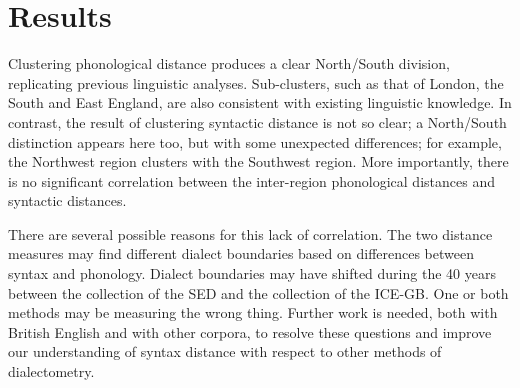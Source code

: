 \documentclass[11pt,letterpaper]{article}
\begin{document}
\section{Results}
Clustering phonological distance produces a clear North/South division, replicating
previous linguistic analyses. Sub-clusters, such as that of London, the
South and East England, are also consistent with existing linguistic
knowledge. In contrast, the result of clustering syntactic distance is not so clear; a
North/South distinction appears here too, but with some unexpected
differences; for example, the
Northwest region clusters with the Southwest region. More importantly,
there is no significant correlation between the inter-region
phonological distances and syntactic distances.

There are several possible reasons for this lack of correlation. The
two distance measures may find different dialect boundaries based on
differences between syntax and phonology. Dialect boundaries may have
shifted during the 40 years between the collection of the SED and the
collection of the ICE-GB. One or both methods may be measuring the
wrong thing. Further work is needed, both with British English and
with other corpora, to resolve these questions and improve our
understanding of syntax distance with respect to other methods of
dialectometry.



\end{document}
